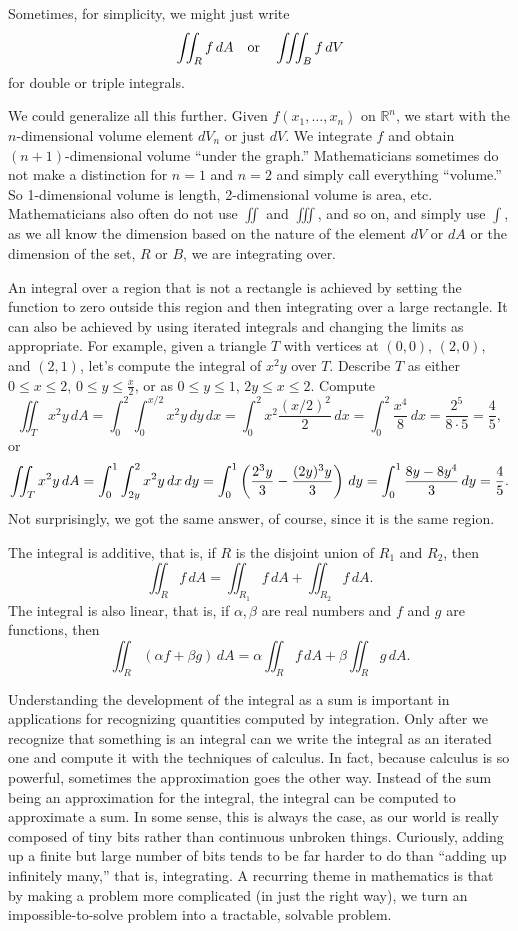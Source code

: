 \documentclass[12pt]{article}
\newcommand{\R}{{\mathbb{R}}}
\newcommand{\avoidbreak}{\postdisplaypenalty=100}
\begin{document}
Sometimes, for simplicity, we might just write
\[
\iint_R f \, dA
\quad \text{or} \quad
\iiint_B f \, dV
\avoidbreak
\]
for double or triple integrals.

We could generalize all this further. Given $f(x_1,\ldots,x_n)$ on $\R^n$, we start with
the $n$-dimensional volume element $dV_n$ or just $dV$.
We integrate $f$ and obtain
$(n+1)$-dimensional volume ``under the graph.''
Mathematicians sometimes do not make a distinction for $n=1$ and $n=2$ and simply call
everything ``volume.''
So 1-dimensional volume is length, 2-dimensional volume is
area, etc.
Mathematicians also often do not use $\iint$ and $\iiint$,
and so on, and simply use $\int$,
as we all know the dimension based on the nature of
the element $dV$ or $dA$ or the dimension of the
set, $R$ or $B$, we are integrating over.

An integral over a region that is not a rectangle
is achieved by setting the function to zero
outside this region and then integrating over
a large rectangle.  It can also be achieved by
using iterated integrals and
changing the limits as appropriate.  For example,
given a triangle $T$ with vertices at $(0,0)$, $(2,0)$,
and $(2,1)$, let's compute the integral of $x^2y$
over $T$.  Describe $T$ as either
$0 \leq x \leq 2$, $0 \leq y \leq \frac{x}{2}$, or as
$0 \leq y \leq 1$, $2y \leq x \leq 2$.  Compute
\[
\iint_T x^2 y \, dA
=
\int_0^2 \int_0^{x/2} x^2y \, dy \, dx
=
\int_0^2 x^2\frac{(x/2)^2}{2}  \, dx
=
\int_0^2 \frac{x^4}{8}  \, dx
=
 \frac{2^5}{8 \cdot 5} = \frac{4}{5} ,
\]
or
\[
\iint_T x^2 y \, dA
=
\int_0^1 \int_{2y}^{2} x^2y \, dx \, dy
=
\int_0^1 \left(\frac{2^3 y}{3} - \frac{(2y)^3y}{3} \right) \, dy
=
\int_0^1 \frac{8y-8y^4}{3} \, dy
=
\frac{4}{5} .
\avoidbreak
\]
Not surprisingly, we got the same answer, of course, since it is the same region.

The integral is additive, that is, if $R$ is the disjoint union of $R_1$ and $R_2$,
then
\[
\iint_R f \, dA = 
\iint_{R_1} f \, dA +
\iint_{R_2} f \, dA .
\]
The integral is also linear, that is, if $\alpha, \beta$ are real numbers and
$f$ and $g$ are functions, then
\[
\iint_R (\alpha f + \beta g) \, dA = 
\alpha \iint_R f \, dA +
\beta \iint_R g \, dA .
\]

Understanding the development of the integral as a sum is important
in applications for recognizing quantities computed by integration.
Only after we recognize that something is an integral can we write the integral as an iterated
one and compute it with the techniques of calculus.
In fact, because calculus is
so powerful, sometimes the approximation goes the other way.
Instead of the sum being an approximation for the integral, the integral can be
computed to approximate a sum.
In some sense, this is always the case, as our world is
really composed of tiny bits rather than continuous unbroken things.
Curiously, adding up a finite but large number of bits tends to be far harder to do than
``adding up infinitely many,'' that is, integrating.
A recurring theme in mathematics is that by making a problem more complicated
(in just the right way), we turn an impossible-to-solve problem
into a tractable, solvable problem.
\end{document}
